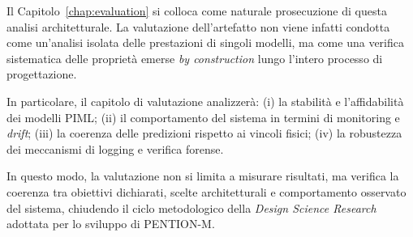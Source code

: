 Il Capitolo~\ref{chap:evaluation} si colloca come naturale prosecuzione di questa analisi architetturale.
La valutazione dell’artefatto non viene infatti condotta come un’analisi isolata delle prestazioni di singoli modelli, ma come una verifica sistematica delle proprietà emerse \emph{by construction} lungo l’intero processo di progettazione.

In particolare, il capitolo di valutazione analizzerà:
(i) la stabilità e l’affidabilità dei modelli PIML;
(ii) il comportamento del sistema in termini di monitoring e \textit{drift};
(iii) la coerenza delle predizioni rispetto ai vincoli fisici;
(iv) la robustezza dei meccanismi di logging e verifica forense.

In questo modo, la valutazione non si limita a misurare risultati, ma verifica la coerenza tra obiettivi dichiarati, scelte architetturali e comportamento osservato del sistema, chiudendo il ciclo metodologico della \emph{Design Science Research} adottata per lo sviluppo di \textsc{PENTION-M}.